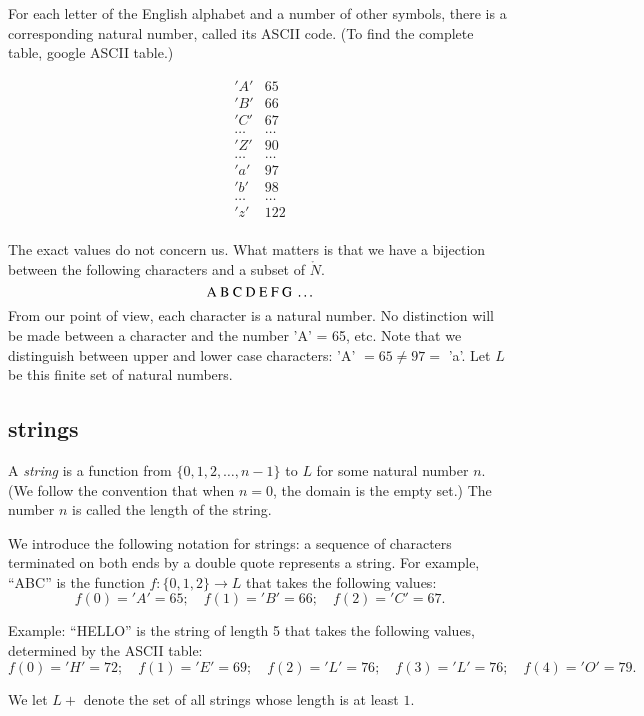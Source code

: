 \documentclass[cup9a]{cupbook}
\begin{document}
For each letter of the English alphabet and a number of other symbols, there is a corresponding natural number, called its ASCII code.  
(To find the complete table, google ASCII table.)

$$
\begin{array}{lll}
'A' & 65\\
'B' & 66\\
'C' & 67\\
\ldots & \ldots\\
'Z' & 90\\
\ldots & \ldots\\
'a' & 97\\
'b' & 98\\
\ldots & \ldots\\
'z' & 122\\
\end{array}
$$

The exact values do not concern us.  What matters is that we have a bijection between the following characters and a subset of $\ring{N}$. 
$$
 \hbox{A\ B\ C\ D\ E\ F\ G\ } \ldots
$$
From our point of view, each character is a natural number.  No distinction will be made between a character and the number 'A' = 65, etc.
Note that we distinguish between upper and lower case characters:
'A' $= 65\ne 97 =$ 'a'.
Let $L$ be this finite set of natural numbers.

\subsection{strings}

A {\it string} is a function from $\{0,1,2,\ldots,n-1\}$ to $L$ for some
natural number $n$.  (We follow the convention that when $n=0$, the domain
is the empty set.)  The number $n$ is called the length of the string.

We introduce the following notation for strings:  a sequence of characters terminated on both ends by a double quote represents a string.  For example,
``ABC'' is the function $f:\{0,1,2\}\to L$ that takes the following values:
$$
f(0) = 'A'  = 65;\quad f(1) = 'B' = 66; \quad f(2) = 'C' = 67.
$$

Example: ``HELLO'' is the string of length 5 that takes the following
values, determined by the ASCII table:
$$
f(0) = 'H'  = 72;\quad f(1) = 'E' = 69; \quad f(2) = 'L' = 76;
\quad f(3) = 'L' = 76; \quad f(4) = 'O' = 79.
$$

We let $L+$ denote the set of all strings whose length is at least $1$.
\end{document}
